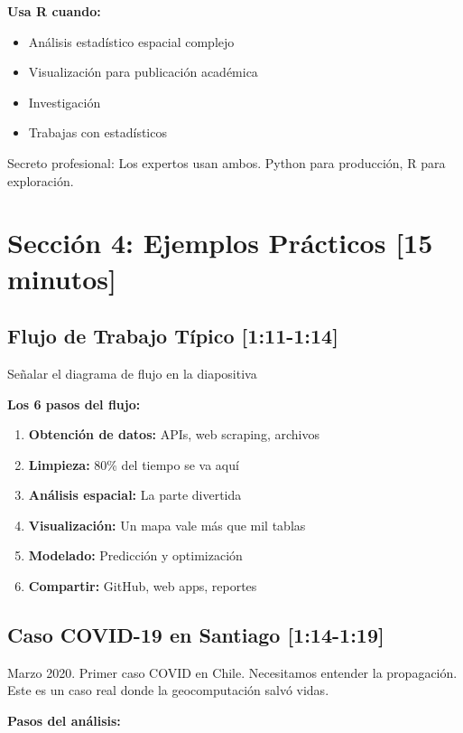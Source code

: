 \documentclass[11pt,a4paper]{article}
\newcommand{\tiempo}[1]{\textcolor{timecolor}{\textbf{[#1]}}}
\newcommand{\decir}[1]{\begin{tcolorbox}[colback=blue!5,colframe=usachblue,title={DECIR}]#1\end{tcolorbox}}
\newcommand{\hacer}[1]{\begin{tcolorbox}[colback=green!5,colframe=green!50!black,title={HACER}]#1\end{tcolorbox}}
\newcommand{\nota}[1]{\begin{tcolorbox}[colback=yellow!10,colframe=orange,title={NOTA}]#1\end{tcolorbox}}
\begin{document}
\textbf{Usa R cuando:}
\begin{itemize}
    \item Análisis estadístico espacial complejo
    \item Visualización para publicación académica
    \item Investigación
    \item Trabajas con estadísticos
\end{itemize}

\nota{Secreto profesional: Los expertos usan ambos. Python para producción, R para exploración.}

\newpage

\section{Sección 4: Ejemplos Prácticos \tiempo{15 minutos}}

\subsection{Flujo de Trabajo Típico \tiempo{1:11-1:14}}

\hacer{Señalar el diagrama de flujo en la diapositiva}

\textbf{Los 6 pasos del flujo:}

\begin{enumerate}
    \item \textbf{Obtención de datos:} APIs, web scraping, archivos
    \item \textbf{Limpieza:} 80\% del tiempo se va aquí
    \item \textbf{Análisis espacial:} La parte divertida
    \item \textbf{Visualización:} Un mapa vale más que mil tablas
    \item \textbf{Modelado:} Predicción y optimización
    \item \textbf{Compartir:} GitHub, web apps, reportes
\end{enumerate}

\subsection{Caso COVID-19 en Santiago \tiempo{1:14-1:19}}

\decir{Marzo 2020. Primer caso COVID en Chile. Necesitamos entender la propagación. Este es un caso real donde la geocomputación salvó vidas.}

\textbf{Pasos del análisis:}
\end{document}
